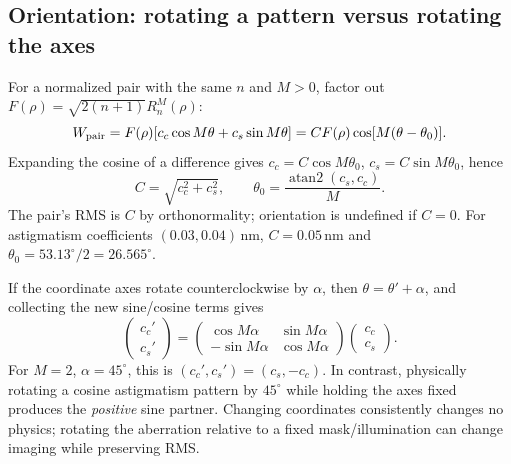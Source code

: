 
\subsection*{Orientation: rotating a pattern versus rotating the axes}
For a normalized pair with the same $n$ and $M>0$, factor out
$F(\rho)=\sqrt{2(n+1)}R_n^M(\rho)$:
\begin{equation}
W_{\rm pair}=F(\rho)[c_c\cos M\theta+c_s\sin M\theta]
=CF(\rho)\cos[M(\theta-\theta_0)].
\end{equation}
Expanding the cosine of a difference gives
$c_c=C\cos M\theta_0$, $c_s=C\sin M\theta_0$, hence
\begin{equation}
C=\sqrt{c_c^2+c_s^2},\qquad
\theta_0=\frac{\operatorname{atan2}(c_s,c_c)}{M}.
\end{equation}
The pair's RMS is $C$ by orthonormality; orientation is undefined if $C=0$. For astigmatism coefficients $(0.03,0.04)\,\mathrm{nm}$, $C=0.05\,\mathrm{nm}$ and $\theta_0=53.13^\circ/2=26.565^\circ$.

If the coordinate axes rotate counterclockwise by $\alpha$, then
$\theta=\theta'+\alpha$, and collecting the new sine/cosine terms gives
\begin{equation}
\begin{pmatrix}c_c'\\c_s'\end{pmatrix}
=\begin{pmatrix}\cos M\alpha&\sin M\alpha\\-\sin M\alpha&\cos M\alpha\end{pmatrix}
\begin{pmatrix}c_c\\c_s\end{pmatrix}.
\end{equation}
For $M=2$, $\alpha=45^\circ$, this is $(c_c',c_s')=(c_s,-c_c)$. In contrast, physically rotating a cosine astigmatism pattern by $45^\circ$ while holding the axes fixed produces the \emph{positive} sine partner. Changing coordinates consistently changes no physics; rotating the aberration relative to a fixed mask/illumination can change imaging while preserving RMS.

